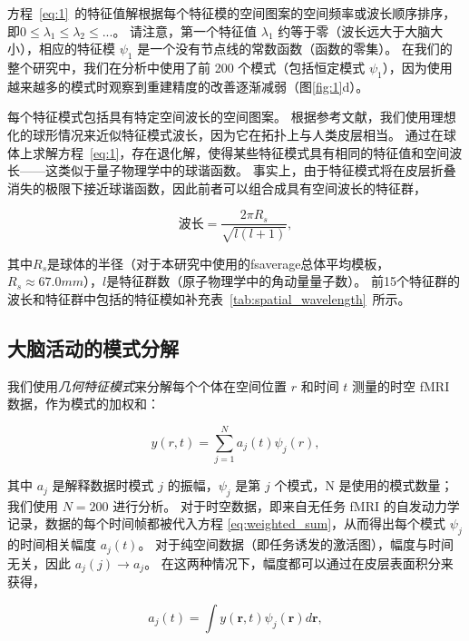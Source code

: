 \documentclass[lang=cn,a4paper,newtx,citestyle=gb7714-2015, bibstyle=gb7714-2015]{elegantpaper}
\begin{document}
方程~\ref{eq:1}~的特征值解根据每个特征模的空间图案的空间频率或波长顺序排序，即$ 0 \leq \lambda_1 \leq \lambda_2 \leq ... $。
请注意，第一个特征值 $ \lambda_1 $ 约等于零（波长远大于大脑大小），相应的特征模 $ \psi_1 $ 是一个没有节点线的常数函数（函数的零集）。
在我们的整个研究中，我们在分析中使用了前 200 个模式（包括恒定模式 $ \psi_1 $），因为使用越来越多的模式时观察到重建精度的改善逐渐减弱（图\ref{fig:1}d）。


每个特征模式包括具有特定空间波长的空间图案。
根据参考文献\cite{robinson2016eigenmodes}，我们使用理想化的球形情况来近似特征模式波长，因为它在拓扑上与人类皮层相当。
通过在球体上求解方程~\ref{eq:1}，存在退化解，使得某些特征模式具有相同的特征值和空间波长——这类似于量子物理学中的球谐函数。
事实上，由于特征模式将在皮层折叠消失的极限下接近球谐函数，因此前者可以组合成具有空间波长的特征群，

\begin{equation}
	\text{波长} = \frac{2 \pi R_s}{\sqrt{l(l+1)}},
\end{equation}

其中$R_s$是球体的半径（对于本研究中使用的fsaverage总体平均模板，$R_s \approx 67.0 mm$），$l$是特征群数（原子物理学中的角动量量子数）。
前15个特征群的波长和特征群中包括的特征模如补充表~\ref{tab:spatial_wavelength}~所示。


\subsection{大脑活动的模式分解} \label{sec:modal_decomposition}

我们使用\textit{几何特征模式}来分解每个个体在空间位置 $ r $ 和时间 $ t $ 测量的时空 fMRI 数据，作为模式的加权和：

\begin{equation}\label{eq:weighted_sum}
	y(r, t) = \sum_{j=1}^{N} a_j(t) \psi_j(r),
\end{equation}

其中 $ a_j  $ 是解释数据时模式 $ j $ 的振幅，$ \psi_j $ 是第 $ j $ 个模式，N 是使用的模式数量；
我们使用 $ N = 200 $ 进行分析。
对于时空数据，即来自无任务 fMRI 的自发动力学记录，数据的每个时间帧都被代入方程 \ref{eq:weighted_sum}，从而得出每个模式 $ \psi_j $ 的时间相关幅度 $ a_j(t) $。
对于纯空间数据（即任务诱发的激活图），幅度与时间无关，因此 $ a_j(j) \rightarrow a_j $。
在这两种情况下，幅度都可以通过在皮层表面积分来获得，

\begin{equation}\label{eq:amplitudes}
	a_j(t) = \int y(\boldsymbol{r}, t) \psi_j(\boldsymbol{r}) d\boldsymbol{r}, 
\end{equation}
\end{document}
